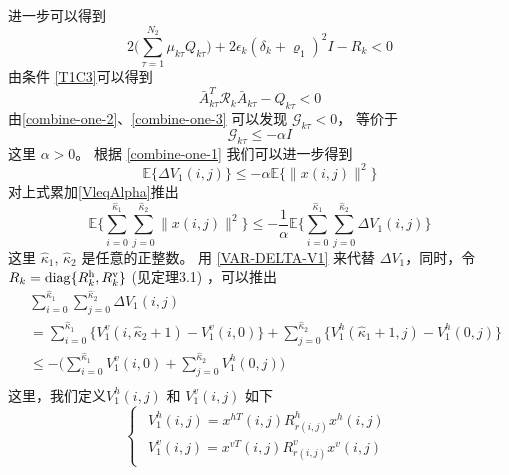 	进一步可以得到
	\begin{equation}\label{combine-one-2}
	2\big(\sum_{\tau =1}^{N_{2}}\mu_{k\tau }Q_{k\tau }\big)+2\epsilon_{k}(\delta_{k}+\varrho_{1})^{2}I-R_{k} < 0
	\end{equation}
	由条件 \eqref{T1C3}可以得到 
	\begin{equation}\label{combine-one-3}
	\bar{A}^{T}_{k\tau }\mathcal{R}_{k}\bar{A}_{k\tau }-Q_{k\tau } < 0
	\end{equation}
	由\eqref{combine-one-2}、\eqref{combine-one-3} 可以发现 $\mathcal{G}_{k\tau }<0$， 等价于
	\begin{equation}
	\mathcal{G}_{k\tau } \leq -\alpha I
	\end{equation}
	这里 $\alpha>0$。
	根据 \eqref{combine-one-1} 我们可以进一步得到
	\begin{equation}\label{VleqAlpha}
	\mathbb{E}\{\varDelta V_{1}(i,j) \} \leq-\alpha \mathbb{E}\{\|x(i,j)\|^{2} \}
	\end{equation}
	对上式累加\eqref{VleqAlpha}推出
	\begin{equation} \label{levE}
	\mathbb{E}\Big\{\sum_{i=0}^{\hat{\kappa}_{1}}\sum_{j=0}^{\hat{\kappa}_{2}}  \|x(i,j)\|^{2} \Big\} \leq -\frac{1}{\alpha} \mathbb{E}\Big\{\sum_{i=0}^{\hat{\kappa}_{1}}\sum_{j=0}^{\hat{\kappa}_{2}}  \varDelta V_{1}(i,j)  \Big\}
	\end{equation}
	这里 $\hat{\kappa}_{1}$, $\hat{\kappa}_{2}$ 是任意的正整数。 用 \eqref{VAR-DELTA-V1} 来代替 $\varDelta V_{1}$，同时，令 $R_{k}=\mathrm{diag}\{R^{\rm{h}}_{k},R^{\rm{v}}_{k}\}$ (见定理3.1) ，可以推出
	\begin{equation} \label{Vhv}
	\begin{split}
	&\sum_{i=0}^{\hat{\kappa}_{1}}\sum_{j=0}^{\hat{\kappa}_{2}}  \varDelta V_{1}(i,j)\\&= \sum_{i=0}^{\hat{\kappa}_{1}}\big\{V^{v}_{1}(i,\hat{\kappa}_{2}+1) - V^{v}_{1}(i,0) \big\}+  \sum_{j=0}^{\hat{\kappa}_{2}}\big\{V^{h}_{1}(\hat{\kappa}_{1}+1,j) - V^{h}_{1}(0,j) \big\}\\
	&\leq -\big( \sum_{i=0}^{\hat{\kappa}_{1}}V^{v}_{1}(i,0) + \sum_{j=0}^{\hat{\kappa}_{2}}V^{h}_{1}(0,j)\big) \\
	\end{split}
	\end{equation} 
	这里，我们定义$V_{1}^{h}(i,j)$ 和 $V_{1}^{v}(i,j)$ 如下  
	\begin{equation*}
	\left\{
	\begin{array}{lr}
	\begin{split}
	V^{h}_{1}(i,j)=x^{hT}(i,j)R^{h}_{r(i,j)}x^{h}(i,j)\\
	V^{v}_{1}(i,j)=x^{vT}(i,j)R^{v}_{r(i,j)}x^{v}(i,j)
	\end{split}
	\end{array}
	\right.
	\end{equation*}
